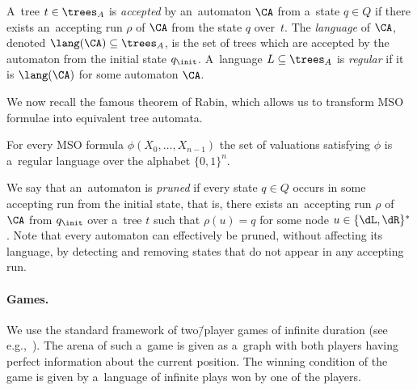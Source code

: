 \documentclass{lmcs}
\numberwithin{equation}{section}
\numberwithin{figure}{section}
\begin{document}
A~tree $t\in\trees_A$ is \emph{accepted} by an~automaton $\CA$ from a~state $q\in Q$ if there exists an~accepting run $\rho$ of $\CA$ from the state $q$ over~$t$.
The \emph{language} of $\CA$, denoted $\lang(\CA)\subseteq\trees_A$, is the set of trees which are accepted by the automaton from the initial state $q_\init$.
A~language $L\subseteq\trees_A$ is \emph{regular} if it is $\lang(\CA)$ for some automaton $\CA$.

We now recall the famous theorem of Rabin, which allows us to transform MSO formulae into equivalent tree automata.

\begin{thmC}
	For every MSO formula $\phi(X_0,\ldots,X_{n-1})$ the set of valuations satisfying $\phi$ is a~regular language over the alphabet $\{0,1\}^n$.
\end{thmC}
\noindent %
We say that an~automaton is \emph{pruned} if every state $q\in Q$ occurs in some accepting run from the initial state, that is,
there exists an~accepting run $\rho$ of $\CA$ from $q_{\init}$ over a~tree $t$ such that $\rho(u)=q$ for some node $u\in\{\dL,\dR\}^\ast$.
Note that every automaton can effectively be pruned, without affecting its language, by detecting and removing states that do not appear in any accepting run.


\paragraph*{Games.}
We use the standard framework of two\=/player games of infinite duration (see e.g.,~\cite{buchi_synthesis,fijalkow_games}).
The arena of such a~game is given as a~graph with both players having perfect information about the current position.
The winning condition of the game is given by a~language of infinite plays won by one of the players.
\end{document}
